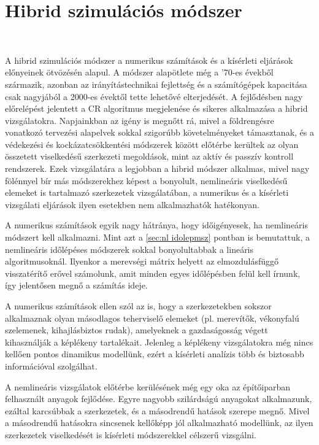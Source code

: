 \chapter{Hibrid szimulációs módszer}\label{chap:hibrid}

{\ }


A hibrid szimulációs módszer a numerikus számítások és a kísérleti eljárások előnyeinek ötvözésén alapul.  A módszer alapötlete még a '70-es évekből származik, azonban az irányítástechnikai fejlettség és a számítógépek  kapacitása csak  nagyjából a 2000-es évektől tette lehetővé elterjedését. A fejlődésben nagy előrelépést jelentett a CR algoritmus megjelenése és sikeres alkalmazása a hibrid vizsgálatokra.  Napjainkban az igény is megnőtt rá, mivel a földrengésre vonatkozó tervezési alapelvek sokkal szigorúbb követelményeket támasztanak, és a védekezési és kockázatcsökkentési módszerek között előtérbe kerültek  az olyan összetett viselkedésű szerkezeti  megoldások, mint az aktív és passzív kontroll rendszerek. Ezek  vizsgálatára a legjobban  a hibrid módszer alkalmas, mivel nagy fölénnyel bír más módszerekhez képest a bonyolult, nemlineáris viselkedésű elemeket is tartalmazó szerkezetek vizsgálatában, a numerikus és a kísérleti vizsgálati eljárások ilyen esetekben nem alkalmazhatók hatékonyan.

A numerikus számítások egyik nagy hátránya, hogy időigényesek, ha nemlineáris módszert kell alkalmazni. Mint azt a \ref{sec:nl idolepmsz} pontban is bemutattuk, a nemlineáris időlépéses módszerek sokkal bonyolultabbak a lineáris algoritmusoknál. Ilyenkor a merevségi mátrix helyett az elmozdulásfüggő visszatérítő erővel számolunk, amit minden egyes időlépésben felül kell írnunk, így jelentősen megnő a számítás ideje.
 
A numerikus számítások ellen szól az is, hogy a szerkezetekben sokszor alkalmaznak olyan másodlagos teherviselő elemeket (pl. merevítők, vékonyfalú  szelemenek, kihajlásbiztos rudak), amelyeknek a gazdaságosság végett kihasználják a képlékeny tartalékait. Jelenleg a képlékeny vizsgálatokra még nincs kellően pontos dinamikus modellünk, ezért a kísérleti analízis több és biztosabb információval szolgálhat.

A nemlineáris vizsgálatok előtérbe kerülésének még egy oka az építőiparban felhasznált anyagok fejlődése. Egyre nagyobb szilárdságú anyagokat alkalmazunk, ezáltal karcsúbbak a  szerkezetek, és a másodrendű hatások szerepe megnő. Mivel a másodrendű hatásokra  sincsenek kellőképp jól alkalmazható modellünk, az ilyen szerkezetek viselkedését is kísérleti módszerekkel célszerű vizsgálni.

